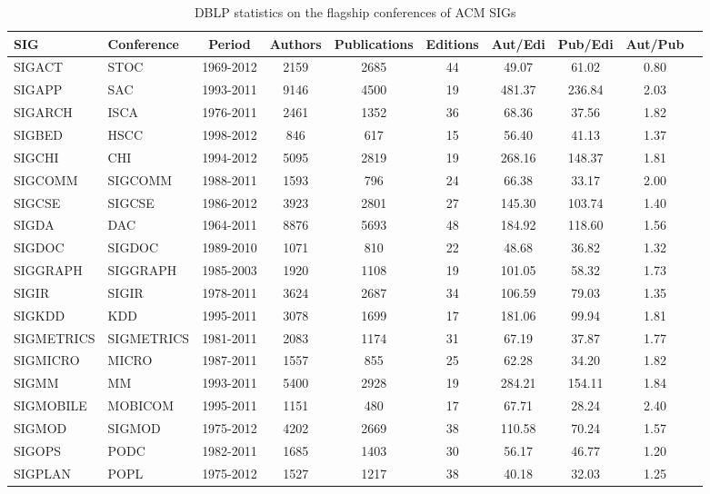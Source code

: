 \begin{table*}[!htb]
\centering
\caption{DBLP statistics on the flagship conferences of ACM SIGs}
\label{tab:sigs_conference_period}
{\small
\begin{tabular}{|l|l|c|c|c|c|c|c|c|c|} \hline
\bf{SIG} & \bf{Conference} & \bf{Period} & \bf{Authors} & \bf{Publications} & \bf{Editions} & \bf{Aut/Edi} & \bf{Pub/Edi} & \bf{Aut/Pub}\\ \hline
SIGACT & STOC & 1969-2012 & 2159 & 2685 & 44 & 49.07 & 61.02 & 0.80\\ \hline
SIGAPP & SAC & 1993-2011 & 9146 & 4500 & 19 & 481.37 & 236.84 & 2.03\\ \hline
SIGARCH & ISCA & 1976-2011 & 2461 & 1352 & 36 & 68.36 & 37.56 & 1.82\\ \hline
SIGBED & HSCC & 1998-2012 & 846 & 617 & 15 & 56.40 & 41.13 & 1.37\\ \hline
SIGCHI & CHI & 1994-2012 & 5095 & 2819 & 19 & 268.16 & 148.37 & 1.81\\ \hline
SIGCOMM & SIGCOMM & 1988-2011 & 1593 & 796 & 24 & 66.38 & 33.17 & 2.00\\ \hline
SIGCSE & SIGCSE & 1986-2012 & 3923 & 2801 & 27 & 145.30 & 103.74 & 1.40\\ \hline
SIGDA & DAC & 1964-2011 & 8876 & 5693 & 48 & 184.92 & 118.60 & 1.56\\ \hline
SIGDOC & SIGDOC & 1989-2010 & 1071 & 810 & 22 & 48.68 & 36.82 & 1.32\\ \hline
SIGGRAPH & SIGGRAPH & 1985-2003 & 1920 & 1108 & 19 & 101.05 & 58.32 & 1.73\\ \hline
SIGIR & SIGIR & 1978-2011 & 3624 & 2687 & 34 & 106.59 & 79.03 & 1.35\\ \hline
SIGKDD & KDD & 1995-2011 & 3078 & 1699 & 17 & 181.06 & 99.94 & 1.81\\ \hline
SIGMETRICS & SIGMETRICS & 1981-2011 & 2083 & 1174 & 31 & 67.19 & 37.87 & 1.77\\ \hline
SIGMICRO & MICRO & 1987-2011 & 1557 & 855 & 25 & 62.28 & 34.20 & 1.82\\ \hline
SIGMM & MM & 1993-2011 & 5400 & 2928 & 19 & 284.21 & 154.11 & 1.84\\ \hline
SIGMOBILE & MOBICOM & 1995-2011 & 1151 & 480 & 17 & 67.71 & 28.24 & 2.40\\ \hline
SIGMOD & SIGMOD & 1975-2012 & 4202 & 2669 & 38 & 110.58 & 70.24 & 1.57\\ \hline
SIGOPS & PODC & 1982-2011 & 1685 & 1403 & 30 & 56.17 & 46.77 & 1.20\\ \hline
SIGPLAN & POPL & 1975-2012 & 1527 & 1217 & 38 & 40.18 & 32.03 & 1.25\\ \hline

\end{tabular}}
\end{table*}
